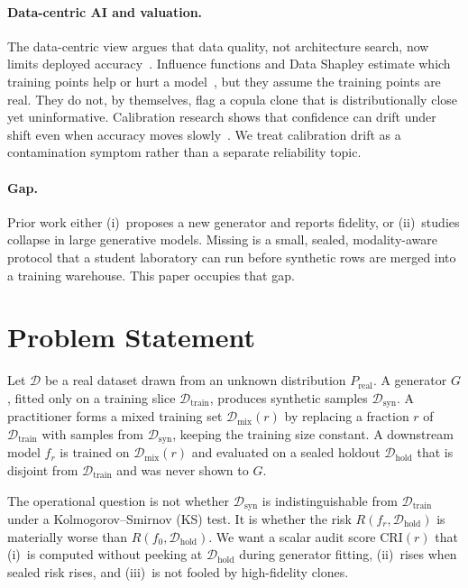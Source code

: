 \documentclass[conference]{IEEEtran}
\begin{document}
\paragraph{Data-centric AI and valuation.}
The data-centric view argues that data quality, not architecture search, now limits deployed accuracy~\cite{ng2021datacentric,zha2023survey}.
Influence functions and Data Shapley estimate which training points help or hurt a model~\cite{koh2017influence,ghorbani2019shapley}, but they assume the training points are real.
They do not, by themselves, flag a copula clone that is distributionally close yet uninformative.
Calibration research shows that confidence can drift under shift even when accuracy moves slowly~\cite{guo2017calibration,niculescu2005predicting}.
We treat calibration drift as a contamination symptom rather than a separate reliability topic.

\paragraph{Gap.}
Prior work either (i)~proposes a new generator and reports fidelity, or (ii)~studies collapse in large generative models.
Missing is a small, sealed, modality-aware protocol that a student laboratory can run before synthetic rows are merged into a training warehouse.
This paper occupies that gap.

\section{Problem Statement}
\label{sec:problem}
Let $\mathcal{D}$ be a real dataset drawn from an unknown distribution $P_{\mathrm{real}}$.
A generator $G$, fitted only on a training slice $\mathcal{D}_{\mathrm{train}}$, produces synthetic samples $\mathcal{D}_{\mathrm{syn}}$.
A practitioner forms a mixed training set $\mathcal{D}_{\mathrm{mix}}(r)$ by replacing a fraction $r$ of $\mathcal{D}_{\mathrm{train}}$ with samples from $\mathcal{D}_{\mathrm{syn}}$, keeping the training size constant.
A downstream model $f_r$ is trained on $\mathcal{D}_{\mathrm{mix}}(r)$ and evaluated on a sealed holdout $\mathcal{D}_{\mathrm{hold}}$ that is disjoint from $\mathcal{D}_{\mathrm{train}}$ and was never shown to $G$.

The operational question is not whether $\mathcal{D}_{\mathrm{syn}}$ is indistinguishable from $\mathcal{D}_{\mathrm{train}}$ under a Kolmogorov--Smirnov (KS) test.
It is whether the risk $R(f_r,\mathcal{D}_{\mathrm{hold}})$ is materially worse than $R(f_0,\mathcal{D}_{\mathrm{hold}})$.
We want a scalar audit score $\mathrm{CRI}(r)$ that (i)~is computed without peeking at $\mathcal{D}_{\mathrm{hold}}$ during generator fitting, (ii)~rises when sealed risk rises, and (iii)~is not fooled by high-fidelity clones.
\end{document}
